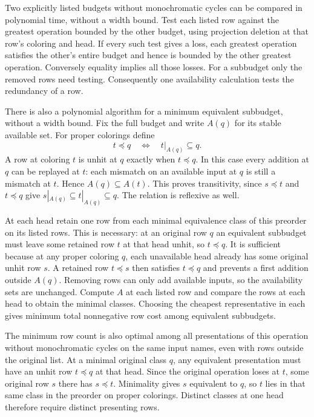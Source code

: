 Two explicitly listed budgets without monochromatic
cycles can be compared in polynomial time, without a
width bound. Test each listed row against the greatest
operation bounded by the other budget, using projection
deletion at that row's coloring and head. If every such
test gives a loss, each greatest operation satisfies
the other's entire budget and hence is bounded by the
other greatest operation. Conversely equality implies
all those losses. For a subbudget only the removed rows
need testing. Consequently one availability calculation
tests the redundancy of a row.

There is also a polynomial algorithm for a minimum
equivalent subbudget, without a width bound. Fix the
full budget and write $A(q)$ for its stable available
set. For proper colorings define
\[
             t\preceq q \quad\Longleftrightarrow\quad
             t|_{A(q)}\subseteq q .
\]
A row at coloring $t$ is unhit at $q$ exactly when
$t\preceq q$. In this case every addition at $q$ can
be replayed at $t$: each mismatch on an available
input at $q$ is still a mismatch at $t$. Hence
$A(q)\subseteq A(t)$. This proves transitivity, since
$s\preceq t$ and $t\preceq q$ give
$s|_{A(q)}\subseteq t|_{A(q)}\subseteq q$.
The relation is reflexive as well.

At each head retain one row from each minimal
equivalence class of this preorder on its listed
rows. This is necessary: at an original row $q$
an equivalent subbudget must leave some retained
row $t$ at that head unhit, so $t\preceq q$.
It is sufficient because at any proper coloring
$q$, each unavailable head already has some original
unhit row $s$. A retained row $t\preceq s$ then
satisfies $t\preceq q$ and prevents a first addition
outside $A(q)$. Removing rows can only add available
inputs, so the availability sets are unchanged.
Compute $A$ at each listed row and compare the rows
at each head to obtain the minimal classes. Choosing
the cheapest representative in each gives minimum
total nonnegative row cost among equivalent subbudgets.

The minimum row count is also optimal among all
presentations of this operation without monochromatic
cycles on the same input names, even with rows outside
the original list. At a minimal original class $q$,
any equivalent presentation must have an unhit row
$t\preceq q$ at that head. Since the original
operation loses at $t$, some original row $s$ there
has $s\preceq t$. Minimality gives $s$ equivalent
to $q$, so $t$ lies in that same class in the preorder
on proper colorings. Distinct classes at one head
therefore require distinct presenting rows.

